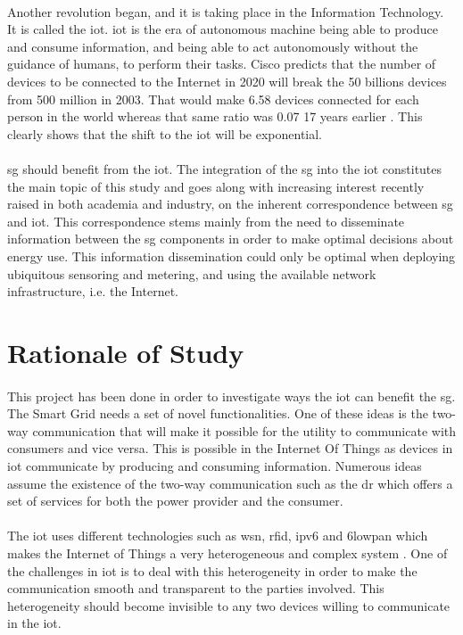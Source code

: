 \documentclass[oneside,12pt,a4paper,final]{book}
\begin{document}
\paragraph{}
Another revolution began, and it is taking place in the Information Technology. It is called the \gls{iot}. \gls{iot} is the era of autonomous machine being able to produce and consume information, and being able to act autonomously without the guidance of humans, to perform their tasks. Cisco predicts that the number of devices to be connected to the Internet in 2020 will break the 50 billions devices from 500 million in 2003. That would make 6.58 devices connected for each person in the world whereas that same ratio was 0.07 17 years earlier \cite{ref3}. This clearly shows that the shift to the \gls{iot} will be exponential.
\paragraph{}
\gls{sg} should benefit from the \gls{iot}. The integration of the \gls{sg} into the \gls{iot} constitutes the main topic of this study and goes along with increasing interest recently raised in both academia and industry, on the inherent correspondence between \gls{sg} and \gls{iot}. This  correspondence stems mainly from the need to disseminate information between the \gls{sg} components in order to make optimal decisions about energy use. This information dissemination could only be optimal when deploying ubiquitous sensoring and metering, and using the available network infrastructure, i.e. the Internet.   


\section{Rationale of Study}
\paragraph{}
This project has been done in order to investigate ways the \gls{iot} can benefit the \gls{sg}. The Smart Grid needs a set of novel functionalities. One of these ideas is the two-way communication that will make it possible for the utility to communicate with consumers and vice versa. This is possible in the Internet Of Things as devices in \gls{iot} communicate by producing and consuming information. Numerous ideas assume the existence of the two-way communication such as the \gls{dr} which offers a set of services for both the power provider and the consumer.
\paragraph{}
The \gls{iot} uses different technologies such as \gls{wsn}, \gls{rfid}, \gls{ipv6} and \gls{6lowpan} which makes the Internet of Things a very heterogeneous and complex system \cite{ref4}. One of the challenges in \gls{iot} is to deal with this heterogeneity in order to make the communication smooth and transparent to the parties involved. This heterogeneity should become invisible to any two devices willing to communicate in the \gls{iot}.
\end{document}
